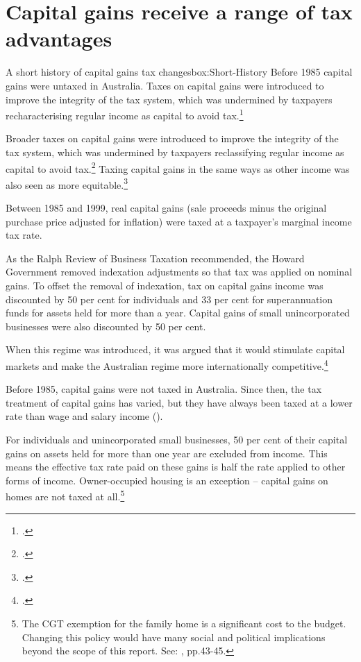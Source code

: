 \documentclass{grattanAlpha}\usepackage[]{graphicx}\usepackage[]{color}
\begin{document}
\section{Capital gains receive a range of tax advantages}\label{sec:CG-receive-tax-advantages}
\begin{smallbox}[p]{A short history of capital gains tax changes}{box:Short-History}
Before 1985 capital gains were untaxed in Australia. Taxes on capital gains were introduced to improve the integrity of the tax system, which was undermined by taxpayers recharacterising regular income as capital to avoid tax.\footcite{ReinhardtSteel2006}

Broader taxes on capital gains were introduced to improve the integrity of the tax system, which was undermined by taxpayers reclassifying regular income as capital to avoid tax.\footcites{Evans2005}{Kenny2005} Taxing capital gains in the same ways as other income was also seen as more equitable.\footcite{AustralianGovernment1985}

Between 1985 and 1999, real capital gains (sale proceeds minus the original purchase price adjusted for inflation) were taxed at a taxpayer’s marginal income tax rate. 

As the Ralph Review of Business Taxation recommended, the Howard Government removed indexation adjustments so that tax was applied on nominal gains. To offset the removal of indexation, tax on capital gains income was discounted by 50 per cent for individuals and 33 per cent for superannuation funds for assets held for more than a year. Capital gains of small unincorporated businesses were also discounted by 50 per cent. 

When this regime was introduced, it was argued that it would stimulate capital markets and make the Australian regime more internationally competitive.\footcite[][14, 598]{RalphReview1999}
\end{smallbox}
Before 1985, capital gains were not taxed in Australia. Since then, the tax treatment of capital gains has varied, but they have always been taxed at a lower rate than wage and salary income (). 

For individuals and unincorporated small businesses, 50 per cent of their capital gains on assets held for more than one year are excluded from income. This means the effective tax rate paid on these gains is half the rate applied to other forms of income. Owner-occupied housing is an exception – capital gains on homes are not taxed at all.\footnote{The CGT exemption for the family home is a significant cost to the budget. Changing this policy would have many social and political implications beyond the scope of this report. See: \textcite{DaleyMcGannonSavageEtAl2013BalancingBudgets}, pp.43-45.}
\end{document}
